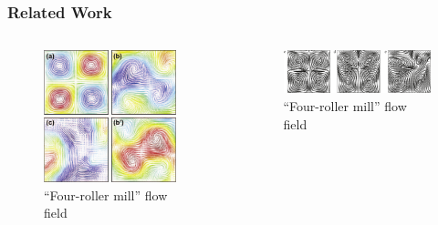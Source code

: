 \begin{frame}
  \frametitle{Related Work}
  \begin{columns}
    \begin{column}{0.5\textwidth}
      \begin{figure}[t]
        \centering
        \includegraphics[width=0.9\textwidth]{img/liu1.pdf}
        \caption{``Four-roller mill'' flow field~\footnotemark[1]}
        \label{fig:snap}
      \end{figure}
    \end{column}
    \begin{column}{0.5\textwidth}
      \begin{figure}[t]
        \centering
        \includegraphics[width=1.0\textwidth]{img/th.pdf}
        \caption{``Four-roller mill'' flow field~\footnotemark[2]}
        \label{fig:snap}
      \end{figure}
    \end{column}
  \end{columns}
\end{frame}


